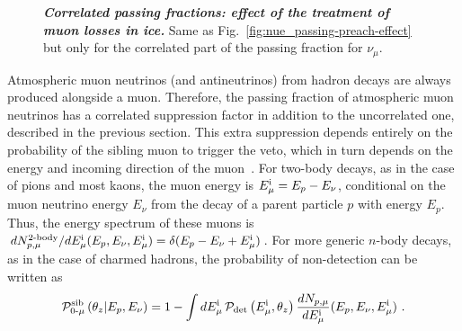 \documentclass[aps,prd,showpacs,letterpaper,onecolumn,longbibliography,superscriptaddress,notitlepage,nofootinbib]{revtex4-1}%
\newcommand{\Emi}{E_{\mu}^{\rm i}}
\newcommand{\Prob}{{\cal P}}
\newcommand{\Pzmsib}{\Prob_{0\text{-}\mu}^{\rm sib}}
\begin{document}
\begin{figure}
\centering
\caption{\textbf{\textit{Correlated passing fractions: effect of the treatment of muon losses in ice.}} Same as Fig.~\ref{fig:nue_passing-preach-effect} but only for the correlated part of the passing fraction for $\nu_\mu$.}
\label{fig:nu-mu-correlated-preach-effect}
\end{figure}

Atmospheric muon neutrinos (and antineutrinos) from hadron decays are always produced alongside a muon. Therefore, the passing fraction of atmospheric muon neutrinos has a correlated suppression factor in addition to the uncorrelated one, described in the previous section. This extra suppression depends entirely on the probability of the sibling muon to trigger the veto, which in turn depends on the energy and incoming direction of the muon~\cite{Schonert:2008is}. For two-body decays, as in the case of pions and most kaons, the muon energy is $\Emi = E_p - E_\nu$, conditional on the muon neutrino energy $E_\nu$ from the decay of a parent particle $p$ with energy $E_p$. Thus, the energy spectrum of these muons is $dN_{p, \mu}^{2 \text{-body}}/d\Emi(E_p, E_\nu, \Emi) = \delta(E_p-E_\nu+\Emi)$. For more generic $n$-body decays, as in the case of charmed hadrons, the probability of non-detection can be written as
%
\begin{equation}
\label{eq:pnomusib}
\Pzmsib \left(\theta_z|E_p, E_\nu \right) = 1 - \int d\Emi \, \Prob_{\rm det}\left(\Emi, \theta_z\right) \frac{dN_{p, \mu}}{d\Emi}(E_p, E_\nu, \Emi) ~.
\end{equation}
\end{document}
